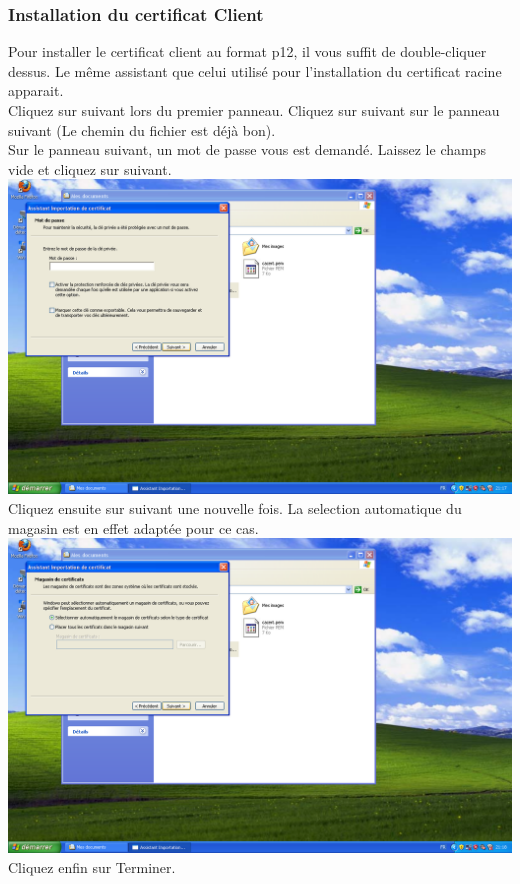 \subsubsection{Installation du certificat Client}
Pour installer le certificat client au format p12, il vous suffit de double-cliquer dessus. Le même assistant que celui utilisé pour l'installation du certificat racine apparait.\\
Cliquez sur suivant lors du premier panneau. Cliquez sur suivant sur le panneau suivant (Le chemin du fichier est déjà bon).\\
Sur le panneau suivant, un mot de passe vous est demandé. Laissez le champs vide et cliquez sur suivant.\\
\includegraphics[width=\screenShotSize{}]{imgUser/importClient.PNG}\\
Cliquez ensuite sur suivant une nouvelle fois. La selection automatique du magasin est en effet adaptée pour ce cas. \\
\includegraphics[width=\screenShotSize{}]{imgUser/importClient2.PNG}\\
Cliquez enfin sur Terminer.\\

